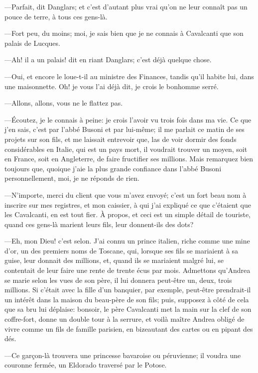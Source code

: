 —Parfait, dit Danglars; et c'est d'autant plus vrai qu'on ne leur connaît pas un pouce de terre, à tous ces gens-là. 

—Fort peu, du moins; moi, je sais bien que je ne connais à Cavalcanti que son palais de Lucques. 

—Ah! il a un palais! dit en riant Danglars; c'est déjà quelque chose. 

—Oui, et encore le loue-t-il au ministre des Finances, tandis qu'il habite lui, dans une maisonnette. Oh! je vous l'ai déjà dit, je crois le bonhomme serré. 

—Allons, allons, vous ne le flattez pas. 

—Écoutez, je le connais à peine: je crois l'avoir vu trois fois dans ma vie. Ce que j'en sais, c'est par l'abbé Busoni et par lui-même; il me parlait ce matin de ses projets sur son fils, et me laissait entrevoir que, las de voir dormir des fonds considérables en Italie, qui est un pays mort, il voudrait trouver un moyen, soit en France, soit en Angleterre, de faire fructifier ses millions. Mais remarquez bien toujours que, quoique j'aie la plus grande confiance dans l'abbé Busoni personnellement, moi, je ne réponds de rien. 

—N'importe, merci du client que vous m'avez envoyé; c'est un fort beau nom à inscrire sur mes registres, et mon caissier, à qui j'ai expliqué ce que c'étaient que les Cavalcanti, en est tout fier. À propos, et ceci est un simple détail de touriste, quand ces gens-là marient leurs fils, leur donnent-ils des dots? 

—Eh, mon Dieu! c'est selon. J'ai connu un prince italien, riche comme une mine d'or, un des premiers noms de Toscane, qui, lorsque ses fils se mariaient à sa guise, leur donnait des millions, et, quand ils se mariaient malgré lui, se contentait de leur faire une rente de trente écus par mois. Admettons qu'Andrea se marie selon les vues de son père, il lui donnera peut-être un, deux, trois millions. Si c'était avec la fille d'un banquier, par exemple, peut-être prendrait-il un intérêt dans la maison du beau-père de son fils; puis, supposez à côté de cela que sa bru lui déplaise: bonsoir, le père Cavalcanti met la main sur la clef de son coffre-fort, donne un double tour à la serrure, et voilà maître Andrea obligé de vivre comme un fils de famille parisien, en bizeautant des cartes ou en pipant des dés. 

—Ce garçon-là trouvera une princesse bavaroise ou péruvienne; il voudra une couronne fermée, un Eldorado traversé par le Potose. 

